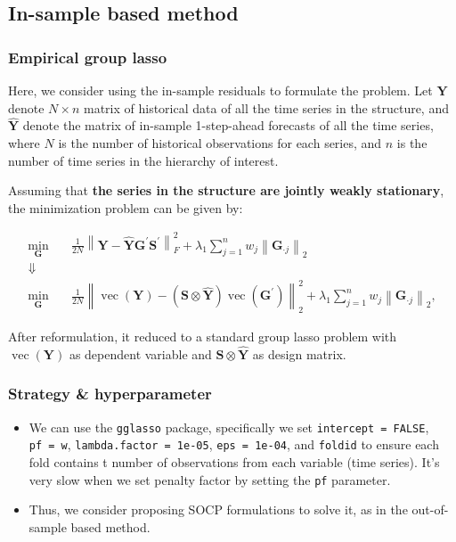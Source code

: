 \documentclass[
  letterpaper,
  DIV=11,
  numbers=noendperiod]{scrartcl}
\providecommand{\tightlist}{%
  \setlength{\itemsep}{0pt}\setlength{\parskip}{0pt}}\usepackage{longtable,booktabs,array}
\begin{document}
\hypertarget{in-sample-based-method}{%
\subsection{In-sample based method}\label{in-sample-based-method}}

\hypertarget{empirical-group-lasso}{%
\subsubsection{Empirical group lasso}\label{empirical-group-lasso}}

Here, we consider using the in-sample residuals to formulate the
problem. Let \(\boldsymbol{Y}\) denote \(N \times n\) matrix of
historical data of all the time series in the structure, and
\(\hat{\boldsymbol{Y}}\) denote the matrix of in-sample 1-step-ahead
forecasts of all the time series, where \(N\) is the number of
historical observations for each series, and \(n\) is the number of time
series in the hierarchy of interest.

Assuming that \textbf{the series in the structure are jointly weakly
stationary}, the minimization problem can be given by:

\[
\begin{aligned}
\min _{\boldsymbol{G}} & \quad \frac{1}{2 N} \left\|\boldsymbol{Y}-\hat{\boldsymbol{Y}} \boldsymbol{G}^{\prime} \boldsymbol{S}^{\prime}\right\|_F^2 + \lambda_1 \sum_{j=1}^n w_j \left\|\boldsymbol{G}_{\cdot j}\right\|_2 \\
\Downarrow \\
\min _{\boldsymbol{G}} & \quad \frac{1}{2 N} \left\|\operatorname{vec}(\boldsymbol{Y})-(\boldsymbol{S} \otimes \hat{\boldsymbol{Y}}) \operatorname{vec}\left(\boldsymbol{G}^{\prime}\right)\right\|_2^2 + \lambda_1 \sum_{j=1}^n w_j \left\|\boldsymbol{G}_{\cdot j}\right\|_2,
\end{aligned}
\]

After reformulation, it reduced to a standard group lasso problem with
\(\operatorname{vec}(\boldsymbol{Y})\) as dependent variable and
\(\boldsymbol{S} \otimes \hat{\boldsymbol{Y}}\) as design matrix.

\hypertarget{strategy-hyperparameter-1}{%
\subsubsection{Strategy \&
hyperparameter}\label{strategy-hyperparameter-1}}

\begin{itemize}
\tightlist
\item
  We can use the \texttt{gglasso} package, specifically we set
  \texttt{intercept\ =\ FALSE}, \texttt{pf\ =\ w},
  \texttt{lambda.factor\ =\ 1e-05}, \texttt{eps\ =\ 1e-04}, and
  \texttt{foldid} to ensure each fold contains t number of observations
  from each variable (time series). {It's very slow when we set penalty
  factor by setting the \texttt{pf} parameter.}
\item
  Thus, we consider proposing SOCP formulations to solve it, as in the
  out-of-sample based method.
\end{itemize}
\end{document}
